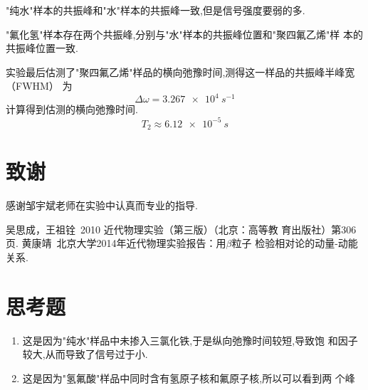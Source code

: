 \documentclass[aps,pre,12pt,preprint,onecolumn,showpacs,showkeys]{revtex4-1}
\begin{document}
"纯水"样本的共振峰和"水"样本的共振峰一致,但是信号强度要弱的多.

"氟化氢"样本存在两个共振峰,分别与"水"样本的共振峰位置和"聚四氟乙烯"样
本的共振峰位置一致.

实验最后估测了"聚四氟乙烯"样品的横向弛豫时间,测得这一样品的共振峰半峰宽（FWHM）
为\begin{equation}
\Delta\omega = \SI{3.267e4}{s^{-1}}
\end{equation}
计算得到估测的横向弛豫时间.
\begin{equation}
T_2 \approx \SI{6.12e-5}{s}
\end{equation}

\section{致谢}

感谢邹宇斌老师在实验中认真而专业的指导.


\begin{thebibliography}{}
 吴思成，王祖铨~2010 近代物理实验（第三版）（北京：高等教
育出版社）第306页. 
 黄康靖~北京大学2014年近代物理实验报告：用$\beta$粒子
  检验相对论的动量-动能关系.
\end{thebibliography}

\clearpage
\appendix
\section{思考题}
\begin{enumerate}
\item  这是因为"纯水"样品中未掺入三氯化铁,于是纵向弛豫时间较短,导致饱
  和因子较大,从而导致了信号过于小.
\item 这是因为"氢氟酸"样品中同时含有氢原子核和氟原子核,所以可以看到两
  个峰
\end{enumerate}
\end{document}
